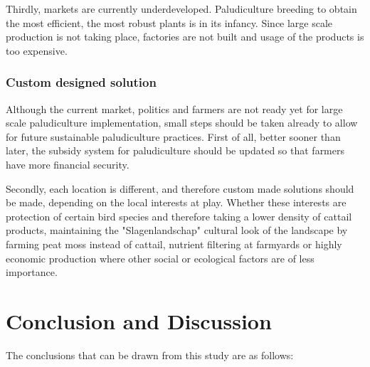 \documentclass[a4paper,12pt]{scrbook}
\begin{document}
Thirdly, markets are currently underdeveloped. Paludiculture breeding to obtain the most efficient, the most robust plants is in its infancy. Since large scale production is not taking place, factories are not built and usage of the products is too expensive. 

\subsection{Custom designed solution}
Although the current market, politics and farmers are not ready yet for large scale paludiculture implementation, small steps should be taken already to allow for future sustainable paludiculture practices. First of all, better sooner than later, the subsidy system for paludiculture should be updated so that farmers have more financial security. 

Secondly, each location is different, and therefore custom made solutions should be made, depending on the local interests at play. Whether these interests are protection of certain bird species and therefore taking a lower density of cattail products, maintaining the "Slagenlandschap" cultural look of the landscape by farming peat moss instead of cattail, nutrient filtering at farmyards or highly economic production where other social or ecological factors are of less importance.

\chapter{Conclusion and Discussion} \label{ch:condis}

The conclusions that can be drawn from this study are as follows:
\end{document}
